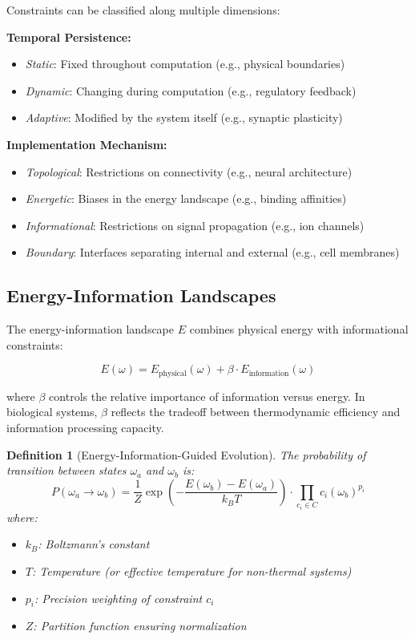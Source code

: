 \documentclass[11pt]{article}
\newtheorem{definition}{Definition}
\begin{document}
Constraints can be classified along multiple dimensions:

\textbf{Temporal Persistence:}
\begin{itemize}
\item \textit{Static}: Fixed throughout computation (e.g., physical boundaries)
\item \textit{Dynamic}: Changing during computation (e.g., regulatory feedback)
\item \textit{Adaptive}: Modified by the system itself (e.g., synaptic plasticity)
\end{itemize}

\textbf{Implementation Mechanism:}
\begin{itemize}
\item \textit{Topological}: Restrictions on connectivity (e.g., neural architecture)
\item \textit{Energetic}: Biases in the energy landscape (e.g., binding affinities)
\item \textit{Informational}: Restrictions on signal propagation (e.g., ion channels)
\item \textit{Boundary}: Interfaces separating internal and external (e.g., cell membranes)
\end{itemize}

\subsection{Energy-Information Landscapes}

The energy-information landscape $E$ combines physical energy with informational constraints:

\begin{equation}
E(\omega) = E_{\text{physical}}(\omega) + \beta \cdot E_{\text{information}}(\omega)
\end{equation}

where $\beta$ controls the relative importance of information versus energy. In biological systems, $\beta$ reflects the tradeoff between thermodynamic efficiency and information processing capacity.

\begin{definition}[Energy-Information-Guided Evolution]
The probability of transition between states $\omega_a$ and $\omega_b$ is:
\begin{equation}
P(\omega_a \to \omega_b) = \frac{1}{Z}\exp\left(-\frac{E(\omega_b) - E(\omega_a)}{k_B T}\right) \cdot \prod_{c_i \in C} c_i(\omega_b)^{p_i}
\end{equation}
where:
\begin{itemize}
\item $k_B$: Boltzmann's constant
\item $T$: Temperature (or effective temperature for non-thermal systems)
\item $p_i$: Precision weighting of constraint $c_i$
\item $Z$: Partition function ensuring normalization
\end{itemize}
\end{definition}
\end{document}
